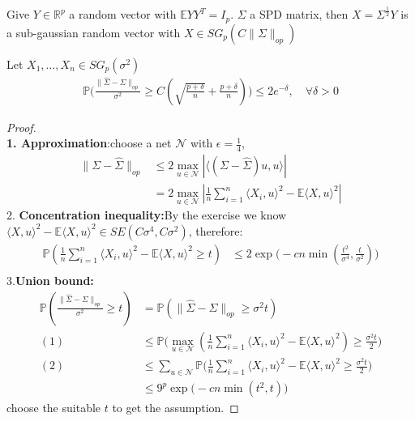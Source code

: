 \begin{example}
	Give $Y \in \mathbb{R}^p $ a random vector with $\mathbb{E} Y Y^T = I_p$. $\Sigma$ a SPD matrix, then $X = \Sigma^{\frac{1}{2}} Y$ is a sub-gaussian random vector with $X \in SG_p(C\|\Sigma\|_{op})$
\end{example}

\begin{theorem}
Let $X_1, \dots, X_n \in SG_p(\sigma^2)$
\begin{align*}
	\mathbb{P}\bigg( \frac{\|\hat{\Sigma} - \Sigma\|_{op}}{\sigma^2} \geq 
	C(\sqrt{\frac{p+\delta}{n}} + \frac{p+ \delta}{n}) \bigg) \le2e^{-\delta}, \quad \forall \delta > 0
\end{align*}
\end{theorem}
\begin{proof}
	\quad\\
	\textbf{1. Approximation}:choose a net $\mathcal{N}$ with $\epsilon = \frac{1}{4}$, 
	\begin{align*}
		\|\Sigma - \hat{\Sigma}\|_{op} &\le 2\max_{u \in \mathcal{N}}|\langle (\Sigma - \hat{\Sigma})u, u \rangle|\\
		&= 2\max_{u \in \mathcal{N}}|\frac{1}{n}\sum_{i = 1}^n \langle X_i, u \rangle^2 - \mathbb{E}\langle X, u\rangle^2|
	\end{align*}
	2. \textbf{Concentration inequality:}By the exercise we know $\langle X, u\rangle^2 - \mathbb{E}\langle X, u\rangle^2 \in SE(C\sigma^4, C\sigma^2)$, therefore:
	\begin{align*}
		\mathbb{P}(\frac{1}{n}\sum_{i = 1}^n \langle X_i, u\rangle^2 - \mathbb{E}\langle X, u\rangle^2 \ge t) &\le 2\exp\bigg(-cn \min(\frac{t^2}{\sigma^4}, \frac{t}{\sigma^2})\bigg)\\
	\end{align*}
	3.\textbf{Union bound:}
	\begin{align*}
		\mathbb{P}(\frac{\|\hat{\Sigma} - \Sigma\|_{op}}{\sigma^2} \ge t) &= \mathbb{P}(\|\hat{\Sigma} - \Sigma\|_{op} \ge \sigma^2 t ) \\
		(1)&\le\mathbb{P}\bigg( \max_{u \in \mathcal{N}}(\frac{1}{n}\sum_{i = 1}^n \langle X_i, u\rangle^2- \mathbb{E}\langle X, u\rangle^2) \ge \frac{\sigma^2 t}{2} \bigg)\\
		(2)&\le\sum_{u \in \mathcal{N}}\mathbb{P}\bigg( \frac{1}{n} \sum_{i = 1}^n \langle X_i, u\rangle^2 - \mathbb{E} \langle X, u\rangle^2 \geq \frac{\sigma^2 t}{2}\bigg)\\
		&\le 9^p \exp\bigg(-cn \min(t^2, t)\bigg)
	\end{align*}
	choose the suitable $t$ to get the assumption.
\end{proof}







